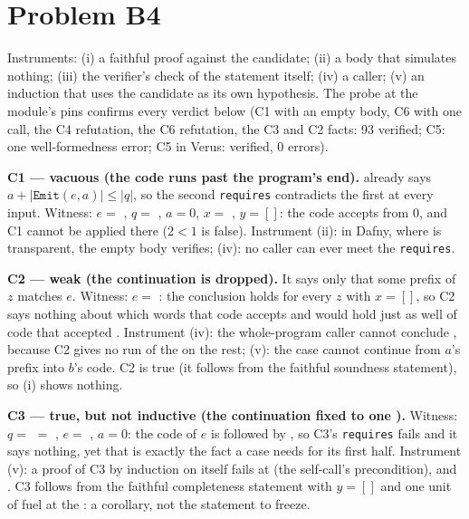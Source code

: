 \documentclass[11pt]{article}
\begin{document}
\section*{Problem B4}\label{ans:B4}
\begin{answer}
Instruments: (i) a faithful proof against the candidate; (ii) a body that
simulates nothing; (iii) the verifier's check of the statement itself; (iv) a
caller; (v) an induction that uses the candidate as its own hypothesis. The
probe at the module's pins confirms every verdict below (C1 with an empty body,
C6 with one  call, the C4 refutation, the C6 refutation, the
C3 and C2 facts: 93 verified; C5: one well-formedness error; C5 in Verus:
verified, 0 errors).

\textbf{C1 --- vacuous (the code runs past the program's end).} 
already says $a + |\mathtt{Emit}(e, a)| \le |q|$, so the second
\texttt{requires} contradicts the first at every input. Witness: $e =$
, $q =$ , $a = 0$, $x =$ \dfy{['a']},
$y = []$: the code accepts \dfy{['a']} from 0, and C1 cannot be applied there
($2 < 1$ is false). Instrument (ii): in Dafny, where  is
transparent, the empty body verifies; (iv): no caller can ever meet the
\texttt{requires}.

\textbf{C2 --- weak (the continuation is dropped).} It says only that some
prefix of $z$ matches $e$. Witness: $e =$ : the conclusion
holds for every $z$ with $x = []$, so C2 says nothing about which words that
code accepts and would hold just as well of code that accepted \dfy{['b']}.
Instrument (iv): the whole-program caller cannot conclude ,
because C2 gives no run of the  on the rest; (v): the 
case cannot continue from $a$'s prefix into $b$'s code. C2 is true (it follows
from the faithful soundness statement), so (i) shows nothing.

\textbf{C3 --- true, but not inductive (the continuation fixed to one
).} Witness: $q =$  $=$
, $e =$ , $a = 0$: the code
of $e$ is followed by , so C3's \texttt{requires} fails and it
says nothing, yet that is exactly the fact a  case needs for its first
half. Instrument (v): a proof of C3 by induction on itself fails at
 (the self-call's precondition),  and . C3 follows
from the faithful completeness statement with $y = []$ and one unit of fuel at
the : a corollary, not the statement to freeze.


\end{answer}
\end{document}
